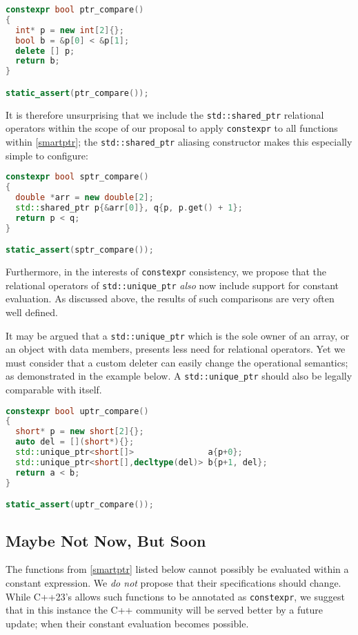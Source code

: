 \documentclass[10pt]{article}
\newcommand*{\wgxxi}[1]{[\href{https://wg21.link/#1}{#1}]}
\begin{document}
\begin{lstlisting}[language=cpp]
constexpr bool ptr_compare()
{
  int* p = new int[2]{};
  bool b = &p[0] < &p[1];
  delete [] p;
  return b;
}

static_assert(ptr_compare());
\end{lstlisting}

It is therefore unsurprising that we include the \texttt{std::shared\_ptr}
relational operators within the scope of our proposal to apply
\texttt{constexpr} to all functions within \wgxxi{smartptr}; the
\texttt{std::shared\_ptr} aliasing constructor makes this especially simple to
configure:

\begin{lstlisting}[language=cpp]
constexpr bool sptr_compare()
{
  double *arr = new double[2];
  std::shared_ptr p{&arr[0]}, q{p, p.get() + 1};
  return p < q;
}

static_assert(sptr_compare());
\end{lstlisting}

Furthermore, in the interests of \texttt{constexpr} consistency, we propose
that the relational operators of \texttt{std::unique\_ptr} \emph{also} now
include support for constant evaluation. As discussed above, the results of
such comparisons are very often well defined.

It may be argued that a \texttt{std::unique\_ptr} which is the sole owner of an
array, or an object with data members, presents less need for relational
operators. Yet we must consider that a custom deleter can easily change the
operational semantics; as demonstrated in the example below. A
\texttt{std::unique\_ptr} should also be legally comparable with itself.

\begin{lstlisting}[language=cpp]
constexpr bool uptr_compare()
{
  short* p = new short[2]{};
  auto del = [](short*){};
  std::unique_ptr<short[]>               a{p+0};
  std::unique_ptr<short[],decltype(del)> b{p+1, del};
  return a < b;
}

static_assert(uptr_compare());
\end{lstlisting}

\subsection{Maybe Not Now, But Soon}
\label{sec:mnnbs}

The functions from \wgxxi{smartptr} listed below cannot possibly be evaluated
within a constant expression. We \emph{do not} propose that their
specifications should change. While C++23's \cite{P2448R2} allows such
functions to be annotated as \texttt{constexpr}, we suggest that in this
instance the C++ community will be served better by a future update; when their
constant evaluation becomes possible.
\end{document}
